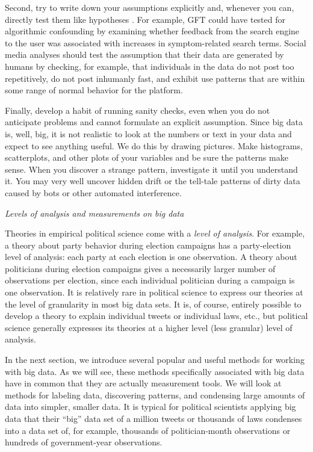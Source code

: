 \documentclass[12pt,]{article}
\begin{document}
Second, try to write down your assumptions explicitly and, whenever you
can, directly test them like hypotheses \citep[see,][]{LBCC16}. For
example, GFT could have tested for algorithmic confounding by examining
whether feedback from the search engine to the user was associated with
increases in symptom-related search terms. Social media analyses should
test the assumption that their data are generated by humans by checking,
for example, that individuals in the data do not post too repetitively,
do not post inhumanly fast, and exhibit use patterns that are within
some range of normal behavior for the platform.

Finally, develop a habit of running sanity checks, even when you do not
anticipate problems and cannot formulate an explicit assumption. Since
big data is, well, big, it is not realistic to look at the numbers or
text in your data and expect to see anything useful. We do this by
drawing pictures. Make histograms, scatterplots, and other plots of your
variables and be sure the patterns make sense. When you discover a
strange pattern, investigate it until you understand it. You may very
well uncover hidden drift or the tell-tale patterns of dirty data caused
by bots or other automated interference.

\emph{Levels of analysis and measurements on big data}

Theories in empirical political science come with a \emph{level of
analysis}. For example, a theory about party behavior during election
campaigns has a party-election level of analysis: each party at each
election is one observation. A theory about politicians during election
campaigns gives a necessarily larger number of observations per
election, since each individual politician during a campaign is one
observation. It is relatively rare in political science to express our
theories at the level of granularity in most big data sets. It is, of
course, entirely possible to develop a theory to explain individual
tweets or individual laws, etc., but political science generally
expresses its theories at a higher level (less granular) level of
analysis.

In the next section, we introduce several popular and useful methods for
working with big data. As we will see, these methods specifically
associated with big data have in common that they are actually
measurement tools. We will look at methods for labeling data,
discovering patterns, and condensing large amounts of data into simpler,
smaller data. It is typical for political scientists applying big data
that their ``big'' data set of a million tweets or thousands of laws
condenses into a data set of, for example, thousands of politician-month
observations or hundreds of government-year observations.
\end{document}
